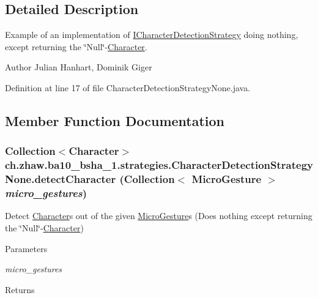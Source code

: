 \subsection{Detailed Description}
Example of an implementation of \hyperlink{interfacech_1_1zhaw_1_1ba10__bsha__1_1_1strategies_1_1ICharacterDetectionStrategy}{ICharacterDetectionStrategy} doing nothing, except returning the \char`\"{}Null\char`\"{}-\/\hyperlink{classch_1_1zhaw_1_1ba10__bsha__1_1_1Character}{Character}.

\begin{DoxyAuthor}{Author}
Julian Hanhart, Dominik Giger 
\end{DoxyAuthor}


Definition at line 17 of file CharacterDetectionStrategyNone.java.

\subsection{Member Function Documentation}
\hypertarget{classch_1_1zhaw_1_1ba10__bsha__1_1_1strategies_1_1CharacterDetectionStrategyNone_adb39d671e0a059ace4a695a03ef53906}{
\subsubsection[{detectCharacter}]{\setlength{\rightskip}{0pt plus 5cm}Collection$<${\bf Character}$>$ ch.zhaw.ba10\_\-bsha\_\-1.strategies.CharacterDetectionStrategyNone.detectCharacter (Collection$<$ {\bf MicroGesture} $>$ {\em micro\_\-gestures})}}
\label{classch_1_1zhaw_1_1ba10__bsha__1_1_1strategies_1_1CharacterDetectionStrategyNone_adb39d671e0a059ace4a695a03ef53906}
Detect \hyperlink{classch_1_1zhaw_1_1ba10__bsha__1_1_1Character}{Character}s out of the given \hyperlink{}{MicroGesture}s (Does nothing except returning the \char`\"{}Null\char`\"{}-\/\hyperlink{classch_1_1zhaw_1_1ba10__bsha__1_1_1Character}{Character})


\begin{DoxyParams}{Parameters}
\item[{\em micro\_\-gestures}]\end{DoxyParams}
\begin{DoxyReturn}{Returns}

\end{DoxyReturn}


